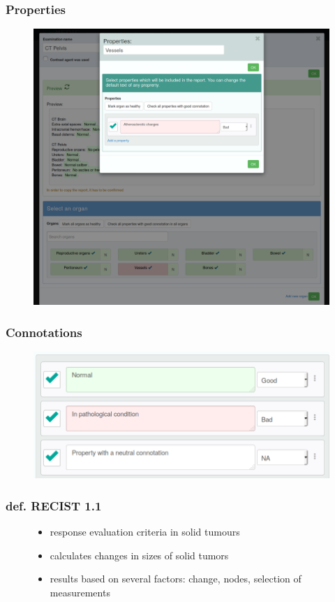 \documentclass{beamer}
\begin{document}
\begin{frame}
\frametitle{Properties}
\begin{figure}
	\centering
	\includegraphics[width=1\linewidth]{../properties-modal}
	\label{fig:properties-list}
\end{figure}
\end{frame}

\begin{frame}
\frametitle{Connotations}
\begin{figure}
	\centering
	\includegraphics[width=1\linewidth]{../property-connotation}
	\label{fig:property-connotation}
\end{figure}
\end{frame}


\begin{frame}
\frametitle{def. RECIST 1.1}
\begin{figure}
\begin{itemize}
	\item response evaluation criteria in solid tumours
	\item calculates changes in sizes of solid tumors
	\item results based on several factors: change, nodes, selection of measurements
	\end{itemize}
\end{figure}
\end{frame}
\end{document}
